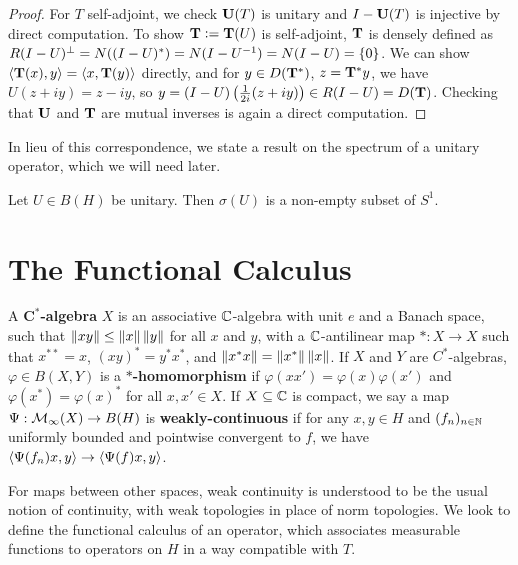 \documentclass[10pt]{amsart}
\begin{document}
\begin{proof}
    For $T$ self-adjoint, we check $\mathbf{U}(T)$ is unitary and $I - \mathbf{U}(T)$ is injective by direct computation. To show $\mathbf{T} \vcentcolon= \mathbf{T}(U)$ is self-adjoint, $\mathbf{T}$ is densely defined as $R(I - U)^\perp = N((I - U)^*) = N(I - U^{-1}) = N(I - U) = \left\{  0  \right\}$. We can show $\left\langle \mathbf{T}(x), y \right\rangle = \left\langle x, \mathbf{T}(y) \right\rangle$ directly, and for $y \in D(\mathbf{T}^*)$, $z = \mathbf{T}^*y$, we have $U(z + iy) = z - iy$, so $y = (I - U)\left(  \frac1{2i}(z + iy)  \right) \in R(I - U) = D(\mathbf{T})$. Checking that $\mathbf{U}$ and $\mathbf{T}$ are mutual inverses is again a direct computation.
\end{proof}
In lieu of this correspondence, we state a result on the spectrum of a unitary operator, which we will need later.
\begin{proposition}
    Let $U \in B(H)$ be unitary. Then $\sigma(U)$ is a non-empty subset of $S^1$.
\end{proposition}
\section{The Functional Calculus}
A \textbf{$\mathbf{C^*}$-algebra} $X$ is an associative $\mathbb{C}$-algebra with unit $e$ and a Banach space, such that $\left\| xy \right\| \leq \left\| x \right\|\left\| y \right\|$ for all $x$ and $y$, with a $\mathbb{C}$-antilinear map $* : X \to X$ such that $x^{**} = x$, $(xy)^* = y^*x^*$, and $\left\| x^*x \right\| = \left\| x^* \right\|\left\| x \right\|$. If $X$ and $Y$ are $C^*$-algebras, $\varphi \in B(X, Y)$ is a \textbf{$\mathbf{*}$-homomorphism} if $\varphi(xx') = \varphi(x)\varphi(x')$ and $\varphi(x^*) = \varphi(x)^*$ for all $x, x' \in X$. %
If $X \subseteq \mathbb{C}$ is compact, we say a map $\Psi : \mathcal{M}_\infty(X) \to B(H)$ is \textbf{weakly-continuous} if for any $x, y \in H$ and $(f_n)_{n \in \mathbb{N}}$ uniformly bounded and pointwise convergent to $f$, we have $\left\langle \Psi(f_n)x, y \right\rangle \to \left\langle \Psi(f)x, y \right\rangle$.

For maps between other spaces, weak continuity is understood to be the usual notion of continuity, with weak topologies in place of norm topologies. We look to define the functional calculus of an operator, which associates measurable functions to operators on $H$ in a way compatible with $T$. 
\end{document}
